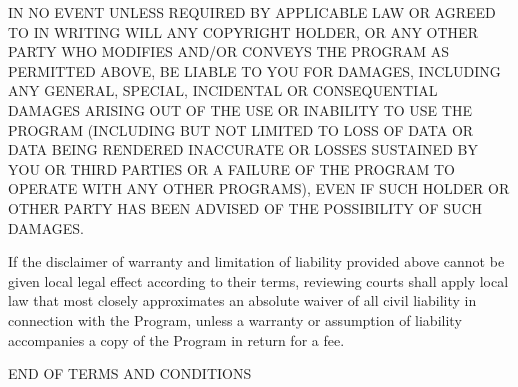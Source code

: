 \documentclass[11pt]{article}
\newcounter{v2section}
\newcounter{v3section}
\begin{document}

  IN NO EVENT UNLESS REQUIRED BY APPLICABLE LAW OR AGREED TO IN WRITING
WILL ANY COPYRIGHT HOLDER, OR ANY OTHER PARTY WHO MODIFIES AND/OR CONVEYS
THE PROGRAM AS PERMITTED ABOVE, BE LIABLE TO YOU FOR DAMAGES, INCLUDING ANY
GENERAL, SPECIAL, INCIDENTAL OR CONSEQUENTIAL DAMAGES ARISING OUT OF THE
USE OR INABILITY TO USE THE PROGRAM (INCLUDING BUT NOT LIMITED TO LOSS OF
DATA OR DATA BEING RENDERED INACCURATE OR LOSSES SUSTAINED BY YOU OR THIRD
PARTIES OR A FAILURE OF THE PROGRAM TO OPERATE WITH ANY OTHER PROGRAMS),
EVEN IF SUCH HOLDER OR OTHER PARTY HAS BEEN ADVISED OF THE POSSIBILITY OF
SUCH DAMAGES.


  If the disclaimer of warranty and limitation of liability provided
above cannot be given local legal effect according to their terms,
reviewing courts shall apply local law that most closely approximates
an absolute waiver of all civil liability in connection with the
Program, unless a warranty or assumption of liability accompanies a
copy of the Program in return for a fee.

\begin{center}
END OF TERMS AND CONDITIONS
\end{center}
\end{document}

